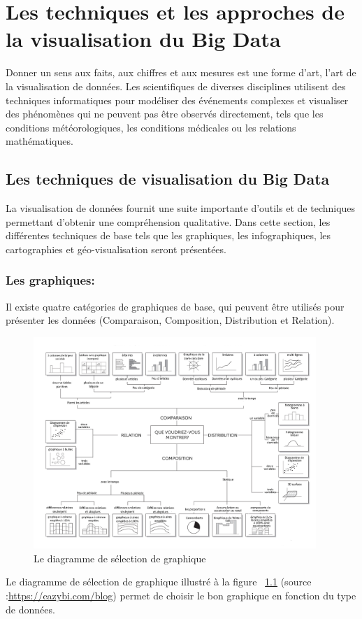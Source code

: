\documentclass[french, a4paper, 12pt]{report}
\begin{document}

\chapter{Les techniques et les approches de la visualisation du Big Data}
Donner un sens aux faits, aux chiffres et aux mesures est une forme d'art, l'art de la visualisation de données. Les scientifiques de diverses disciplines utilisent des techniques informatiques pour modéliser des événements complexes et visualiser des phénomènes qui ne peuvent pas être observés directement, tels que les conditions météorologiques, les conditions médicales ou les relations mathématiques.
\section{Les techniques de visualisation du Big Data}
La visualisation de données fournit une suite importante d’outils et de techniques permettant d’obtenir une compréhension qualitative. Dans cette section, les différentes techniques de base tels que les graphiques, les infographiques,  les cartographies et géo-visualisation seront présentées.
\subsection{Les graphiques:}
Il existe quatre catégories de graphiques de base, qui peuvent être utilisés pour présenter les données (Comparaison, Composition, Distribution et Relation).\\

\begin{figure}[!ht]
    \centering
    \includegraphics[height=8cm]{images/diagramme-de-charts.jpg}
    \caption{Le diagramme de sélection de graphique}
    \label{fig:2.1}
\end{figure}
 Le diagramme de sélection de graphique illustré à la figure ~\ref{fig:2.1} (source :\small \href{https://eazybi.com/blog/data_visualization_and_chart_types/}{https://eazybi.com/blog})
 permet de choisir le bon graphique en fonction du type de données.
\end{document}
